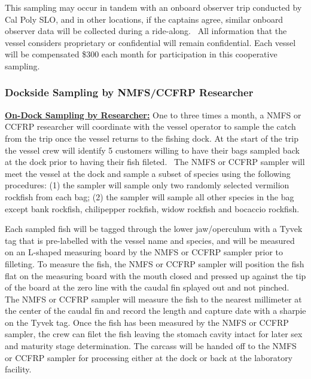 \documentclass[
  letterpaper,
  DIV=11,
  numbers=noendperiod]{scrartcl}
\begin{document}
This sampling may occur in tandem with an onboard observer trip
conducted by Cal Poly SLO, and in other locations, if the captains
agree, similar onboard observer data will be collected during a
ride-along.~ All information that the vessel considers proprietary or
confidential will remain confidential. Each vessel will be compensated
\$300 each month for participation in this cooperative sampling.

\hypertarget{dockside-sampling-by-nmfsccfrp-researcher}{%
\subsubsection{Dockside Sampling by NMFS/CCFRP
Researcher}\label{dockside-sampling-by-nmfsccfrp-researcher}}

\href{https://drive.google.com/file/d/19i_ubpa1QG1Ra2br7qk-RAFmMVGjmr5J/view?usp=sharing}{\textbf{On-Dock
Sampling by Researcher:}} One to three times a month, a NMFS or CCFRP
researcher will coordinate with the vessel operator to sample the catch
from the trip once the vessel returns to the fishing dock. At the start
of the trip the vessel crew will identify 5 customers willing to have
their bags sampled back at the dock prior to having their fish fileted.~
The NMFS or CCFRP sampler will meet the vessel at the dock and sample a
subset of species using the following procedures: (1) the sampler will
sample only two randomly selected vermilion rockfish from each bag; (2)
the sampler will sample all other species in the bag except bank
rockfish, chilipepper rockfish, widow rockfish and bocaccio rockfish.~

Each sampled fish will be tagged through the lower jaw/operculum with a
Tyvek tag that is pre-labelled with the vessel name and species, and
will be measured on an L-shaped measuring board by the NMFS or CCFRP
sampler prior to filleting. To measure the fish, the NMFS or CCFRP
sampler will position the fish flat on the measuring board with the
mouth closed and pressed up against the tip of the board at the zero
line with the caudal fin splayed out and not pinched. The NMFS or CCFRP
sampler will measure the fish to the nearest millimeter at the center of
the caudal fin and record the length and capture date with a sharpie on
the Tyvek tag. Once the fish has been measured by the NMFS or CCFRP
sampler, the crew can filet the fish leaving the stomach cavity intact
for later sex and maturity stage determination. The carcass will be
handed off to the NMFS or CCFRP sampler for processing either at the
dock or back at the laboratory facility.
\end{document}
